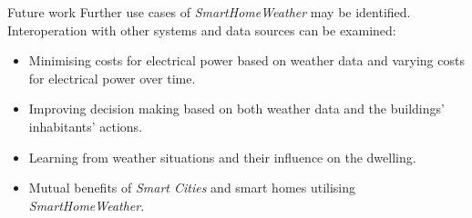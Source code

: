 \documentclass[final,hyperref={pdfpagelabels=true}]{beamer}
\newenvironment{postit}
{\begin{beamercolorbox}[sep=1em,wd=7cm]{postit}}
{\end{beamercolorbox}}
\begin{document}
\begin{frame}[fragile]
\begin{columns}[t]
\begin{column}{.45\textwidth}
      \begin{block}{Future work}
	Further use cases of \emph{SmartHomeWeather} may be identified. Interoperation with other systems and data sources can be examined:
          \begin{itemize}
            \item Minimising costs for electrical power based on weather data and varying costs for electrical power over time.
	    \item Improving decision making based on both weather data and the buildings' inhabitants' actions.
	    \item Learning from weather situations and their influence on the dwelling.
	    \item Mutual benefits of \emph{Smart Cities} and smart homes utilising \emph{SmartHomeWeather}.
	  \end{itemize}
      \end{block}

%	
%	
    \end{column}
  \end{columns}

  
\end{frame}
\end{document}
